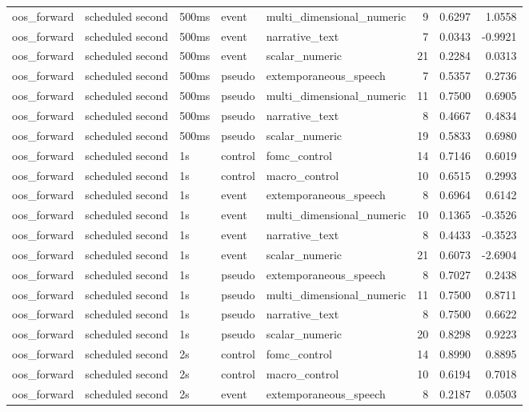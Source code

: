 \begin{tabular}{lllllrrr}
oos_forward & scheduled second & 500ms & event & multi_dimensional_numeric & 9 & 0.6297 & 1.0558 \\
oos_forward & scheduled second & 500ms & event & narrative_text & 7 & 0.0343 & -0.9921 \\
oos_forward & scheduled second & 500ms & event & scalar_numeric & 21 & 0.2284 & 0.0313 \\
oos_forward & scheduled second & 500ms & pseudo & extemporaneous_speech & 7 & 0.5357 & 0.2736 \\
oos_forward & scheduled second & 500ms & pseudo & multi_dimensional_numeric & 11 & 0.7500 & 0.6905 \\
oos_forward & scheduled second & 500ms & pseudo & narrative_text & 8 & 0.4667 & 0.4834 \\
oos_forward & scheduled second & 500ms & pseudo & scalar_numeric & 19 & 0.5833 & 0.6980 \\
oos_forward & scheduled second & 1s & control & fomc_control & 14 & 0.7146 & 0.6019 \\
oos_forward & scheduled second & 1s & control & macro_control & 10 & 0.6515 & 0.2993 \\
oos_forward & scheduled second & 1s & event & extemporaneous_speech & 8 & 0.6964 & 0.6142 \\
oos_forward & scheduled second & 1s & event & multi_dimensional_numeric & 10 & 0.1365 & -0.3526 \\
oos_forward & scheduled second & 1s & event & narrative_text & 8 & 0.4433 & -0.3523 \\
oos_forward & scheduled second & 1s & event & scalar_numeric & 21 & 0.6073 & -2.6904 \\
oos_forward & scheduled second & 1s & pseudo & extemporaneous_speech & 8 & 0.7027 & 0.2438 \\
oos_forward & scheduled second & 1s & pseudo & multi_dimensional_numeric & 11 & 0.7500 & 0.8711 \\
oos_forward & scheduled second & 1s & pseudo & narrative_text & 8 & 0.7500 & 0.6622 \\
oos_forward & scheduled second & 1s & pseudo & scalar_numeric & 20 & 0.8298 & 0.9223 \\
oos_forward & scheduled second & 2s & control & fomc_control & 14 & 0.8990 & 0.8895 \\
oos_forward & scheduled second & 2s & control & macro_control & 10 & 0.6194 & 0.7018 \\
oos_forward & scheduled second & 2s & event & extemporaneous_speech & 8 & 0.2187 & 0.0503 \\

\end{tabular}
